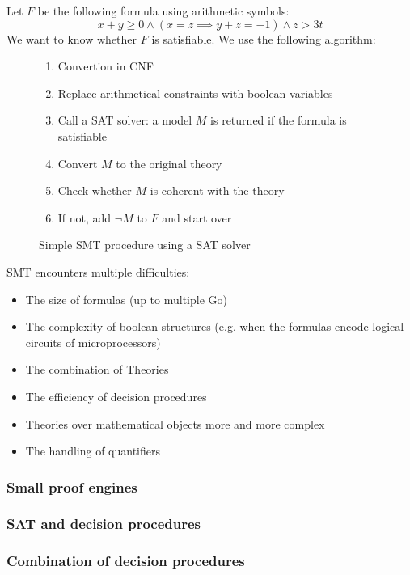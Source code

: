 \documentclass[toc, titlepaged]{../cs-classes/cs-classes}
\begin{document}
Let $F$ be the following formula using arithmetic symbols:
\begin{equation*}
    x+y\geq 0 \land (x=z \implies y+z=-1) \land z > 3t
\end{equation*}
We want to know whether $F$ is satisfiable.
We use the following algorithm:
\begin{figure}[!ht]
    \centering
    \begin{minipage}{0.77\textwidth}
    \begin{enumerate}
        \item Convertion in CNF
        \item Replace arithmetical constraints with boolean variables
        \item Call a SAT solver: a model $M$ is returned if the formula is satisfiable
        \item Convert $M$ to the original theory
        \item Check whether $M$ is coherent with the theory
        \item If not, add $\lnot M$ to $F$ and start over
    \end{enumerate}
    \end{minipage}
    \caption{Simple SMT procedure using a SAT solver}
\end{figure}

SMT encounters multiple difficulties:
\begin{itemize}
    \item The size of formulas (up to multiple Go)
    \item The complexity of boolean structures (e.g. when the formulas encode logical circuits of microprocessors)
    \item The combination of Theories
    \item The efficiency of decision procedures
    \item Theories over mathematical objects more and more complex
    \item The handling of quantifiers
\end{itemize}

\subsubsection{Small proof engines}

\subsubsection{SAT and decision procedures}

\subsubsection{Combination of decision procedures}
\end{document}
